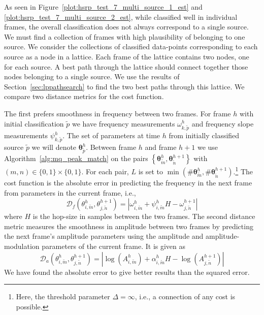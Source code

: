 As seen in Figure~\ref{plot:hsrp_test_7_multi_source_1_est} and
\ref{plot:hsrp_test_7_multi_source_2_est}, while
classified well in individual frames, the overall classification does not
always correspond to a single source. We must find a collection of frames with high
plausibility of belonging to one source. We consider the collections of
classified data-points corresponding to each source as a node in a lattice. Each
frame of the lattice contains two nodes, one for each source. A best path
through the lattice should connect together those nodes belonging to a single
source. We use the results of
Section~\ref{sec:lppathsearch} to find the two best paths through this lattice.
We compare two distance metrics for the cost function.

The first prefers
smoothness in frequency between two frames. For frame $h$ with initial
classification $\tilde{p}$ we have frequency measurements
$\omega_{k,\tilde{p}}^{h}$
and frequency slope measurements $\psi_{k,\tilde{p}}^{h}$. The set of parameters
at time $h$ from initially classified source $\tilde{p}$ we will denote
$\boldsymbol{\theta}_{\tilde{p}}^{h}$. Between frame $h$ and frame $h+1$ we use
Algorithm~\ref{alg:mq_peak_match} on the pairs $\left\{ \boldsymbol{\theta}_{\tilde{m}}^{h},
\boldsymbol{\theta}_{\tilde{n}}^{h+1} \right\}$ with $(m,n) \in \{0,1\} \times
\{0,1\}$. For
each pair, $L$ is set to $\min(\# \boldsymbol{\theta}_{\tilde{m}}^{h} ,
\# \boldsymbol{\theta}_{\tilde{n}}^{h+1}).$\footnote{Here, the threshold parameter $\Delta
= \infty$, i.e., a connection of any cost is possible.} The cost function is the absolute error
in predicting the frequency in the next frame from parameters in the current
frame, i.e.,
\[
    \mathcal{D}_{f} \left( \theta_{i,\tilde{m}}^{h},
    \theta_{j,\tilde{n}}^{h+1} \right) = | \omega_{i,\tilde{m}}^{h} +
    \psi_{i,\tilde{m}}^{h} H - \omega_{j,\tilde{n}}^{h+1} |
\]
where $H$ is the hop-size in samples between the two frames.  The second
distance metric measures the smoothness in amplitude between two frames by
predicting the next frame's amplitude parameters using the amplitude and
amplitude-modulation parameters of the current frame.  It is given as
\[
    \mathcal{D}_{a} \left( \theta_{i,\tilde{m}}^{h},
    \theta_{j,\tilde{n}}^{h+1} \right) = | \log(A_{i,\tilde{m}}^{h}) +
    \alpha_{i,\tilde{m}}^{h} H - \log(A_{j,\tilde{n}}^{h+1}) |
\]
We have found the absolute error to
give better results than the squared error.

